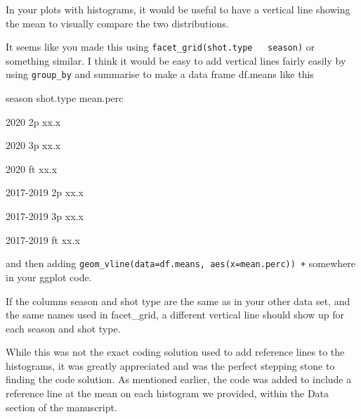 \documentclass[12pt]{article}
\newenvironment{comment}%
{\begin{quoting}\noindent\small\it\ignorespaces%
  }{\end{quoting}}
\begin{document}
\begin{comment}
In your plots with histograms, it would be useful to have a vertical 
line showing the mean to visually compare
the two distributions.

It seems like you made this using \texttt{facet\_grid(shot.type ~ season)} or
something similar. I think it would be easy to add vertical lines fairly 
easily by using \texttt{group\_by} and summarise to make a data frame df.means
like this

season shot.type mean.perc

2020 2p xx.x

2020 3p xx.x

2020 ft xx.x

2017-2019 2p xx.x

2017-2019 3p xx.x

2017-2019 ft xx.x

and then adding
\texttt{geom\_vline(data=df.means, aes(x=mean.perc)) +}
somewhere in your ggplot code.

If the columns season and shot type are the same as in your other data
set, and the same names used in facet\_grid, a different vertical line
should show up for each season and shot type.
\end{comment}

 While this was not the exact coding solution used to add reference lines
 to the histograms, it was greatly appreciated and was the perfect stepping 
 stone to finding the code solution. As mentioned earlier, the code was
 added to include a reference line at the mean on each histogram we provided,
 within the Data section of the manuscript.
\end{document}
